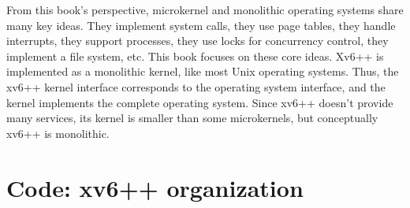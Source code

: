 From this book's perspective, microkernel and monolithic operating
systems share many key ideas.  They implement system calls, they use
page tables, they handle interrupts, they support processes, they use
locks for concurrency control, they implement a file system,
etc. This book focuses on these core ideas.
\nopagebreak[4]
Xv6++ is
implemented as a monolithic kernel, like most Unix operating systems.
Thus, the xv6++ kernel interface corresponds to the operating system
interface, and the kernel implements the complete operating system.  Since
xv6++ doesn't provide many services, its kernel is smaller than some
microkernels, but conceptually xv6++ is monolithic.

\section{Code: xv6++ organization}

